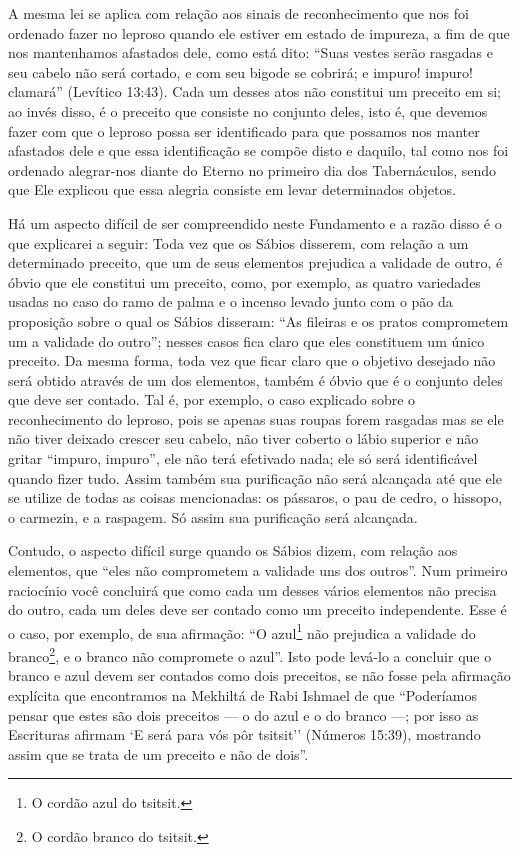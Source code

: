 A mesma lei se aplica com relação aos sinais de reconhecimento que nos
foi ordenado fazer no leproso quando ele estiver em estado de impureza,
a fim de que nos mantenhamos afastados dele, como está dito: ``Suas
vestes serão rasgadas e seu cabelo não será cortado, e com seu bigode se
cobrirá; e impuro! impuro! clamará'' (Levítico 13:43). Cada um desses
atos não constitui um preceito em si; ao invés disso, é o preceito que
consiste no conjunto deles,
isto é, que devemos fazer com que o leproso possa ser identificado para
que possamos nos manter afastados dele e que essa identificação se
compõe disto e daquilo, tal como nos foi ordenado alegrar-nos diante do
Eterno no primeiro dia dos Tabernáculos, sendo que Ele explicou que essa
alegria consiste em levar determinados objetos.

Há um aspecto difícil de ser compreendido neste Fundamento e a razão
disso é o que explicarei a seguir: Toda vez que os Sábios disserem, com
relação a um determinado preceito, que um de seus elementos prejudica a
validade de outro, é óbvio que ele constitui um preceito, como, por
exemplo, as quatro variedades usadas no caso do ramo de palma e o
incenso levado junto com o pão da proposição sobre o qual os Sábios
disseram: ``As fileiras e os pratos comprometem um a validade do
outro''; nesses casos fica claro que eles constituem um único preceito.
Da mesma forma, toda vez que ficar claro que o objetivo desejado não
será obtido através de um dos elementos, também é óbvio que é o conjunto
deles que deve ser contado. Tal é, por exemplo, o caso explicado sobre o
reconhecimento do leproso, pois se apenas suas roupas forem rasgadas
mas se ele não tiver deixado crescer seu cabelo, não tiver coberto o
lábio superior e não gritar ``impuro, impuro'', ele não terá efetivado
nada; ele só será identificável quando fizer tudo. Assim também sua
purificação não será alcançada até que ele se utilize de todas as coisas
mencionadas: os pássaros, o pau de cedro, o hissopo, o carmezin, e a
raspagem. Só assim sua purificação será alcançada.

Contudo, o aspecto difícil surge quando os Sábios dizem, com relação
aos elementos, que ``eles não comprometem a validade uns dos outros''.
Num primeiro raciocínio você concluirá que como cada um desses vários
elementos não precisa do outro, cada um deles deve ser contado como um
preceito independente. Esse é o caso, por exemplo, de sua afirmação:
``O azul\footnote{O cordão azul do tsitsit.} não prejudica a validade do
branco\footnote{O cordão branco do tsitsit.}, e o branco não compromete o azul''. Isto
pode levá-lo a concluir que o branco e azul devem ser contados como dois
preceitos, se não fosse pela afirmação explícita que encontramos na
Mekhiltá de Rabi Ishmael de que ``Poderíamos pensar que estes são dois
preceitos --- o do azul e o do branco ---; por isso as Escrituras
afirmam `E será para vós pôr tsitsit'' (Números 15:39), mostrando
assim que se trata de um preceito e não de dois''.

